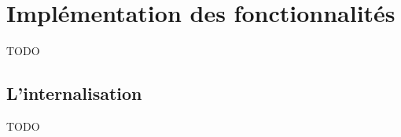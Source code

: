 \section{Implémentation des fonctionnalités}
\label{sec:features-imp}
TODO
    
\subsection{L'internalisation}
\label{subsec:i18n-imp}
TODO